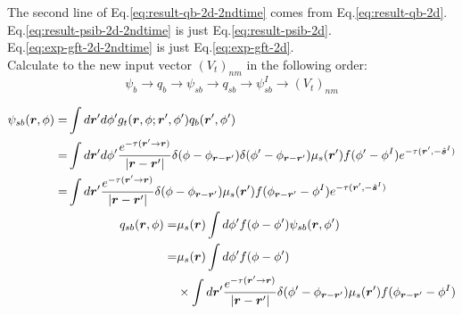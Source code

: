 \documentclass [10pt,letterpaper]{article}
\renewcommand{\vec}{\vectorsym}
\newcommand{\unitvec}[1]{\hat{\vec{#1}}}
\begin{document}
The second line of Eq.\eqref{eq:result-qb-2d-2ndtime} comes from Eq.\eqref{eq:result-qb-2d}.
\\
Eq.\eqref{eq:result-psib-2d-2ndtime} is just Eq.\eqref{eq:result-psib-2d}.
\\
Eq.\eqref{eq:exp-gft-2d-2ndtime} is just Eq.\eqref{eq:exp-gft-2d}.
\\
Calculate to the new input vector $(V_t)_{n m}$ in the following order:
\begin{equation} \label{eq:order-in-which-Vtnm-1pt-is-calculated}
	\psi_b
	\to
	q_b
	\to
	\psi_{sb}
	\to
	q_{sb}
	\to
	\psi_{sb}^I
	\to
	(V_t)_{n m}
\end{equation}

\begin{subequations} \label{eq:result-psisb-qsb-psisbI-2d}
	\begin{align} 
		\begin{split}
			\psi_{sb}(\vec{r},\phi)
			=&
			\int d\vec{r}^\prime d\phi^\prime
			g_t(\vec{r},\phi;\vec{r}^\prime,\phi^\prime)
			q_b(\vec{r}^\prime,\phi^\prime)
			\\
			=& 
			\int d\vec{r}^\prime d\phi^\prime
			\frac
			{e^{-\tau(\vec{r}^\prime\to\vec{r})}}
			{\lvert \vec{r}-\vec{r}^\prime \rvert}
			\delta(\phi-\phi_{\vec{r}-\vec{r}^\prime})
			\delta(\phi^\prime-\phi_{\vec{r}-\vec{r}^\prime})
			\mu_s(\vec{r}^\prime)
			f(\phi^\prime-\phi^I)
			e^{-\tau(\vec{r}^\prime,-\unitvec{s}^I)} 
			\\
			=& 
			\int d\vec{r}^\prime
			\frac
			{e^{-\tau(\vec{r}^\prime\to\vec{r})}}
			{\lvert \vec{r}-\vec{r}^\prime \rvert}
			\delta(\phi-\phi_{\vec{r}-\vec{r}^\prime})
			\mu_s(\vec{r}^\prime)
			f(\phi_{\vec{r}-\vec{r}^\prime}-\phi^I)
			e^{-\tau(\vec{r}^\prime,-\unitvec{s}^I)} 
		\end{split}
		\label{eq:result-psisb-2d}
		\\
		\begin{split} 
			q_{sb}(\vec{r},\phi)
			=&
			\mu_s(\vec{r})
			\int d\phi^\prime
			f(\phi-\phi^\prime)
			\psi_{sb}(\vec{r},\phi^\prime)
			\\
			=&
			\mu_s(\vec{r})
			\int d\phi^\prime
			f(\phi-\phi^\prime)
			\\
			&
			\times
			\int d\vec{r}^\prime
			\frac
			{e^{-\tau(\vec{r}^\prime\to\vec{r})}}
			{\lvert \vec{r}-\vec{r}^\prime \rvert}
			\delta(\phi^\prime-\phi_{\vec{r}-\vec{r}^\prime})
			\mu_s(\vec{r}^\prime)
			f(\phi_{\vec{r}-\vec{r}^\prime}-\phi^I)

\end{split}
\end{align}
\end{subequations}
\end{document}
